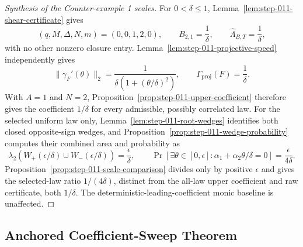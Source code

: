 \begin{proof}[Synthesis of the Counter-example 1 scales]
For $0<\delta\leq1$, Lemma~\ref{lem:step-011-shear-certificate} gives
\begin{equation}
\label{eq:appendix-display-369}
(q,M,\Delta,N,m)=(0,0,1,2,0),
\qquad B_{2,1}=\frac1\delta,
\qquad \widehat\Lambda_{B,T}=\frac1\delta,
\end{equation}
with no other nonzero closure entry.  Lemma~\ref{lem:step-011-projective-speed}
independently gives
\begin{equation}
\label{eq:appendix-display-370}
\|\gamma_F'(\theta)\|_2
=\frac1{\delta(1+(\theta/\delta)^2)},
\qquad
\Gamma_{\mathrm{proj}}(F)=\frac1\delta.
\end{equation}
With $A=1$ and $N=2$, Proposition~\ref{prop:step-011-upper-coefficient}
therefore gives the coefficient $1/\delta$ for every admissible, possibly
correlated law.  For the selected uniform law only,
Lemma~\ref{lem:step-011-root-wedges} identifies both closed opposite-sign
wedges, and Proposition~\ref{prop:step-011-wedge-probability} computes their
combined area and probability as
\begin{equation}
\label{eq:appendix-display-371}
\lambda_2(W_+(\epsilon/\delta)\cup W_-(\epsilon/\delta))
=\frac\epsilon\delta,
\qquad
\Pr[\exists\theta\in[0,\epsilon]:
\alpha_1+\alpha_2\theta/\delta=0]
=\frac{\epsilon}{4\delta}.
\end{equation}
Proposition~\ref{prop:step-011-scale-comparison} divides only by positive
$\epsilon$ and gives the selected-law ratio $1/(4\delta)$, distinct from
the all-law upper coefficient and raw certificate, both $1/\delta$.
The deterministic-leading-coefficient monic baseline is unaffected.
\end{proof}

\subsection{Anchored Coefficient-Sweep Theorem}\label{app:step-012}

